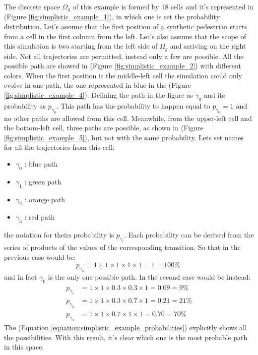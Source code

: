 \documentclass[class=article, crop=false]{standalone}
\begin{document}
The discrete space $\Omega_g$ of this example is formed by 18 cells and it's represented in (Figure \ref{fig:simplistic_example_1}), in which one is set the probability distribution.
Let's assume that the first position of a synthetic pedestrian starts from a cell in the first column from the left.
Let's also assume that the scope of this simulation is two starting from the left side of $\Omega_g$ and arriving on the right side.
Not all trajectories are permitted, instead only a few are possible.
All the possible path are showed in (Figure \ref{fig:simplistic_example_2}) with different colors.
When the first position is the middle-left cell the simulation could only evolve in one path, the one represented in blue in the (Figure \ref{fig:simplistic_example_4}).
Defining the path in the figure as $\gamma_0$ and its probability as $p_{\gamma_0}$.
This path has the probability to happen equal to $p_{\gamma_0} = 1$ and no other paths are allowed from this cell.
Meanwhile, from the upper-left cell and the bottom-left cell, three paths are possible, as shown in (Figure \ref{fig:simplistic_example_5}), but not with the same probability.
Lets set names for all the trajectories from this cell:
\begin{itemize}
\item $\gamma_0$ : blue path
\item $\gamma_1$ : green path
\item $\gamma_2$ : orange path
\item $\gamma_3$ : red path
\end{itemize}
the notation for theirs probability is $p_{\gamma_i}$.
Each probability can be derived from the series of products of the values of the corresponding transition.
So that in the previous case would be:
\begin{equation*}
p_{\gamma_0} = 1 \times 1 \times 1 \times 1 \times 1 = 1 = 100 \% \;
\end{equation*}
and in fact $\gamma_0$ is the only one possible path.
In the second case would be instead:
\begin{equation}
\begin{split}
p_{\gamma_1} & = 1 \times 1 \times 0.3 \times 0.3 \times 1 = 0.09 = 9 \% \\
p_{\gamma_2} & = 1 \times 1 \times 0.3 \times 0.7 \times 1 = 0.21 = 21 \% \\
p_{\gamma_3} & = 1 \times 1 \times 0.7 \times 1 \times 1    = 0.70 = 70 \%
\end{split}
\label{equation:simplistic_example_probabilities}
\end{equation}
The (Equation \ref{equation:simplistic_example_probabilities}) explicitly shows all the possibilities.
With this result, it's clear which one is the most probable path in this space.
\end{document}
